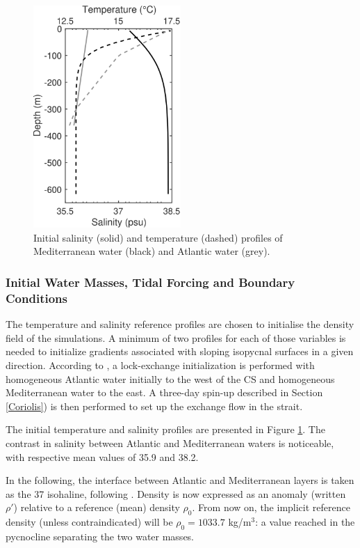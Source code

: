 \begin{figure}[!t]
 \centering
 \includegraphics[width=0.5\textwidth]{./GBR2D/figure3.png}
 \caption[Initial salinity and temperature profiles of Mediterranean water and Atlantic water.]{Initial salinity (solid) and temperature (dashed) profiles of Mediterranean water (black) and Atlantic water (grey).}
\label{fig_LEx}
\end{figure}


\subsubsection{Initial Water Masses, Tidal Forcing and Boundary Conditions}
\label{init}
\indent The temperature and salinity reference profiles are chosen to initialise the density field of the simulations. A minimum of two profiles for each of those variables is needed to initialize gradients associated with sloping isopycnal surfaces in a given direction. According to \citet{Sannino2002}, a lock-exchange initialization is performed with homogeneous Atlantic water initially to the west of the CS and homogeneous Mediterranean water to the east. A three-day spin-up described in Section \ref{Coriolis}) is then performed to set up the exchange flow in the strait.

The initial temperature and salinity profiles are presented in Figure \ref{fig_LEx}. The contrast in salinity between Atlantic and Mediterranean waters is noticeable, with respective mean values of 35.9 and 38.2. 

In the following, the interface between Atlantic and Mediterranean layers is taken as the 37 isohaline, following \citet{Bryden94}. Density is now expressed as an anomaly (written $\rho'$) relative to a reference (mean) density $\rho_{0}$. From now on, the implicit reference density (unless contraindicated) will be $\rho_{0}=1033.7$ kg/m$^3$: a value reached in the pycnocline separating the two water masses.

